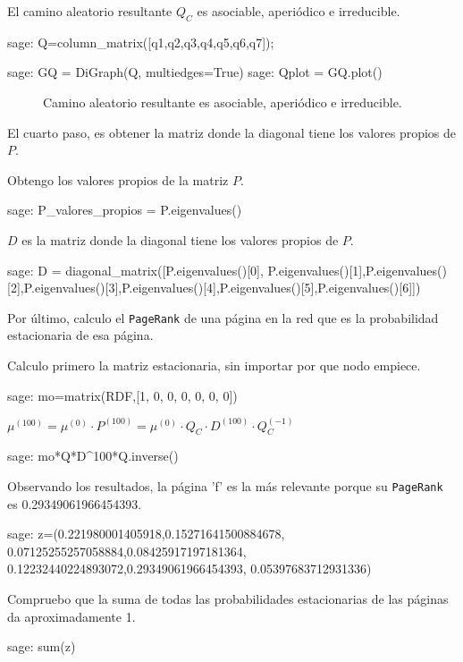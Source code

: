 \par El camino aleatorio resultante $Q_C$ es asociable, aperiódico e irreducible.

\begin{sagecommandline}
    sage: Q=column_matrix([q1,q2,q3,q4,q5,q6,q7]);
\end{sagecommandline}

\begin{sagecommandline}
    sage: GQ = DiGraph(Q, multiedges=True)
    sage: Qplot = GQ.plot()
\end{sagecommandline}
\begin{figure}[H]
    \centering
    \label{caminoZ}
    \caption{Camino aleatorio resultante es asociable, aperiódico e irreducible.}
\end{figure}

\par El cuarto paso, es obtener la matriz donde la diagonal tiene los valores propios de $P$.
\par Obtengo los valores propios de la matriz $P$.
\begin{sagecommandline}
    sage: P_valores_propios = P.eigenvalues()
\end{sagecommandline}

\par $D$ es la matriz donde la diagonal tiene los valores propios de $P$.
\begin{sagecommandline}
    sage: D = diagonal_matrix([P.eigenvalues()[0], P.eigenvalues()[1],P.eigenvalues()[2],P.eigenvalues()[3],P.eigenvalues()[4],P.eigenvalues()[5],P.eigenvalues()[6]])
\end{sagecommandline}

\par Por último, calculo el \texttt{PageRank} de una página en la red que es la probabilidad estacionaria de esa página.
\par Calculo primero la matriz estacionaria, sin importar por que nodo empiece.
\begin{sagecommandline}
    sage: mo=matrix(RDF,[1, 0, 0, 0, 0, 0, 0])
\end{sagecommandline}

\par $\mu^{(100)} = \mu^{(0)} \cdot P^{(100)} = \mu^{(0)} \cdot Q_C \cdot D^{(100)} \cdot Q_C^{(-1)}$
\begin{sagecommandline}
    sage: mo*Q*D^100*Q.inverse()
\end{sagecommandline}
\par Observando los resultados, la página 'f' es la más relevante porque su \texttt{PageRank} es 0.29349061966454393.
\begin{sagecommandline}
    sage: z=(0.221980001405918,0.15271641500884678, 0.07125255257058884,0.08425917197181364, 0.12232440224893072,0.29349061966454393, 0.05397683712931336)
\end{sagecommandline}

\par Compruebo que la suma de todas las probabilidades estacionarias de las páginas da aproximadamente 1.
\begin{sagecommandline}
    sage: sum(z)
\end{sagecommandline}
